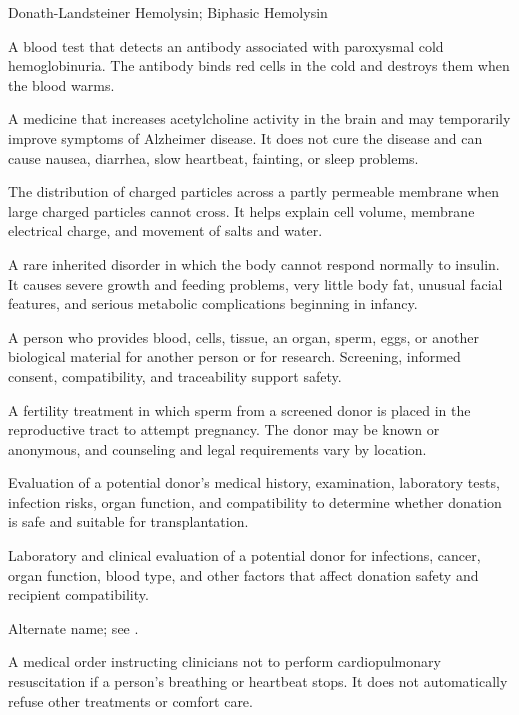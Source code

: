 \synonyms
Donath-Landsteiner Hemolysin; Biphasic Hemolysin

 A blood test that detects an antibody associated with paroxysmal cold hemoglobinuria. The antibody binds red cells in the cold and destroys them when the blood warms.

 A medicine that increases acetylcholine activity in the brain and may temporarily improve symptoms of Alzheimer disease. It does not cure the disease and can cause nausea, diarrhea, slow heartbeat, fainting, or sleep problems.

 The distribution of charged particles across a partly permeable membrane when large charged particles cannot cross. It helps explain cell volume, membrane electrical charge, and movement of salts and water.

 A rare inherited disorder in which the body cannot respond normally to insulin. It causes severe growth and feeding problems, very little body fat, unusual facial features, and serious metabolic complications beginning in infancy.

 A person who provides blood, cells, tissue, an organ, sperm, eggs, or another biological material for another person or for research. Screening, informed consent, compatibility, and traceability support safety.

 A fertility treatment in which sperm from a screened donor is placed in the reproductive tract to attempt pregnancy. The donor may be known or anonymous, and counseling and legal requirements vary by location.

 Evaluation of a potential donor’s medical history, examination, laboratory tests, infection risks, organ function, and compatibility to determine whether donation is safe and suitable for transplantation.

 Laboratory and clinical evaluation of a potential donor for infections, cancer, organ function, blood type, and other factors that affect donation safety and recipient compatibility.

 Alternate name; see .


 A medical order instructing clinicians not to perform cardiopulmonary resuscitation if a person’s breathing or heartbeat stops. It does not automatically refuse other treatments or comfort care.

